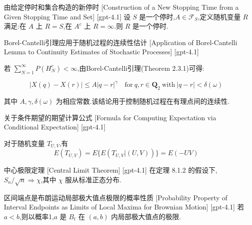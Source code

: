 \documentclass[UTF8]{ctexart}
\begin{document}
    
    
    \begin{thm}
        {由给定停时和集合构造的新停时}
        [Construction of a New Stopping Time from a Given Stopping Time and Set]
        [gpt-4.1]
        设 $S$ 是一个停时,$A \in \mathcal{F}_{S}$,定义随机变量 $R$ 满足:在 $A$ 上 $R = S$,在 $A^{c}$ 上 $R = \infty$.则 $R$ 是一个停时.
    \end{thm}
    
    
    
    \begin{thm}
        {Borel-Cantelli引理应用于随机过程的连续性估计}
        [Application of Borel-Cantelli Lemma to Continuity Estimates of Stochastic Processes]
        [gpt-4.1]
        
若 $\sum_{N=1}^{\infty} P(H_{N}^{c}) < \infty$,由Borel-Cantelli引理(Theorem 2.3.1)可得:

\[
|X(q) - X(r)| \leq A |q - r|^{\gamma} \quad \mathrm{for~} q, r \in \mathbf{Q}_{2} \mathrm{~with~} |q - r| < \delta(\omega)
\]

其中 $A, \gamma, \delta(\omega)$ 为相应常数.该结论用于控制随机过程在有理点间的连续性.

    \end{thm}
    
    
    
    \begin{thm}
        {关于条件期望的期望计算公式}
        [Formula for Computing Expectation via Conditional Expectation]
        [gpt-4.1]
        
对于随机变量 $T_{U,V}$,有
\[
E(T_{U,V}) = E\{ E( T_{U,V} | (U,V) ) \} = E( -UV )
\]

    \end{thm}
    
    
    
    \begin{thm}
        {中心极限定理}
        [Central Limit Theorem]
        [gpt-4.1]
        在定理 8.1.2 的假设下,$S_n / \sqrt{n} \Rightarrow \chi$,其中 $\chi$ 服从标准正态分布.
    \end{thm}
    
    
    
    \begin{thm}
        {区间端点是布朗运动局部极大值点极限的概率性质}
        [Probability Property of Interval Endpoints as Limits of Local Maxima for Brownian Motion]
        [gpt-4.1]
        若 $a < b$,则以概率1,$a$ 是 $B_t$ 在 $(a, b)$ 内局部极大值点的极限.
    \end{thm}
    
\end{document}
